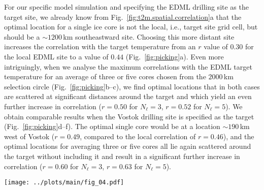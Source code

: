 \documentclass[cp, manuscript]{copernicus}
\begin{document}
For our specific model simulation and specifying the EDML drilling site as the
target site, we already know from {Fig.~\ref{fig:t2m.spatial.correlation}a} that
the optimal location for a single ice core is not the local, i.e., target site
grid cell, but should be a $\sim1200$\,km southeastward site. Choosing this more
distant site increases the correlation with the target temperature from an $r$
value of $0.30$ for the local EDML site to a value of $0.44$
(Fig.~\ref{fig:picking}a). Even more intriguingly, when we analyse the maximum
correlations with the EDML target temperature for an average of three or five
cores chosen from the $2000$\,km selection circle (Fig.~\ref{fig:picking}b--c),
we find optimal locations that in both cases are scattered at significant
distances around the target and which yield an even further increase in
correlation ($r=0.50$ for $N_{\ell}=3$, $r=0.52$ for $N_{\ell}=5$). We obtain
comparable results when the Vostok drilling site is specified as the target
(Fig.~\ref{fig:picking}d--f). The optimal single core would be at a location
$\sim190$\,km west of Vostok ($r=0.49$, compared to the local correlation of
$r=0.46$), and the optimal locations for averaging three or five cores all lie
again scattered around the target without including it and result in a
significant further increase in correlation ($r=0.60$ for $N_{\ell}=3$, $r=0.63$
for $N_{\ell}=5$).

\begin{figure*}[t]%
\centering
\texttt{[image: ../plots/main/fig\_04.pdf]}
\caption[Picking optimal sites]{%
  Selecting ice-core locations that optimally reconstruct interannual
  temperatures at the EDML and Vostok drilling sites. The maps show the
  correlation coefficient in the climate model data between the annual
  temperature time series at the target sites (black crosses) EDML
  (\textbf{a}--\textbf{c}) and Vostok (\textbf{b}--\textbf{f}) with the time
  series fields of precipitation-weighted oxygen isotope composition
  ($\delta^{18}\mathrm{O}^{\mathrm{(pw)}}$). Filled black points denote those
  grid cells that yield the maximum correlation between the target site
  temperature and the $\delta^{18}\mathrm{O}^{\mathrm{(pw)}}$ time series from
  either selecting a single grid cell ($N_{\ell}=1$; \textbf{a}, \textbf{d}) or
  from averaging across $N_{\ell}=3$ (\textbf{b}, \textbf{e}) or $N_{\ell}=5$
  (\textbf{c}, \textbf{f}) grid cells, obtained from iteratively selecting sets
  of $N_{\ell}$ grid cells from within a selection circle of $2000$\,km radius
  around the target site indicated by the black radial lines (see
  Sect.~\ref{methods:opt.sampling} for details). Interestingly, non-local
  ice-core locations systematically show the strongest relationship with the
  target site temperature.}
\label{fig:picking}%
\end{figure*}%
\end{document}

